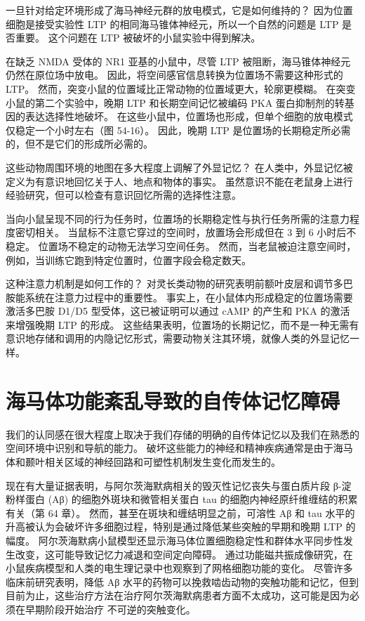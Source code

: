 一旦针对给定环境形成了海马神经元群的放电模式，它是如何维持的？ 因为位置细胞是接受实验性 LTP 的相同海马锥体神经元，所以一个自然的问题是 LTP 是否重要。 这个问题在 LTP 被破坏的小鼠实验中得到解决。

在缺乏 NMDA 受体的 NR1 亚基的小鼠中，尽管 LTP 被阻断，海马锥体神经元仍然在原位场中放电。 因此，将空间感官信息转换为位置场不需要这种形式的 LTP。 然而，突变小鼠的位置域比正常动物的位置域更大，轮廓更模糊。 在突变小鼠的第二个实验中，晚期 LTP 和长期空间记忆被编码 PKA 蛋白抑制剂的转基因的表达选择性地破坏。 在这些小鼠中，位置场也形成，但单个细胞的放电模式仅稳定一个小时左右（图 54-16）。 因此，晚期 LTP 是位置场的长期稳定所必需的，但不是它们的形成所必需的。

这些动物周围环境的地图在多大程度上调解了外显记忆？ 在人类中，外显记忆被定义为有意识地回忆关于人、地点和物体的事实。 虽然意识不能在老鼠身上进行经验研究，但可以检查有意识回忆所需的选择性注意。

当向小鼠呈现不同的行为任务时，位置场的长期稳定性与执行任务所需的注意力程度密切相关。 当鼠标不注意它穿过的空间时，放置场会形成但在 3 到 6 小时后不稳定。 位置场不稳定的动物无法学习空间任务。 然而，当老鼠被迫注意空间时，例如，当训练它跑到特定位置时，位置字段会稳定数天。

这种注意力机制是如何工作的？ 对灵长类动物的研究表明前额叶皮层和调节多巴胺能系统在注意力过程中的重要性。 事实上，在小鼠体内形成稳定的位置场需要激活多巴胺 D1/D5 型受体，这已被证明可以通过 cAMP 的产生和 PKA 的激活来增强晚期 LTP 的形成。 这些结果表明，位置场的长期记忆，而不是一种无需有意识地存储和调用的内隐记忆形式，需要动物关注其环境，就像人类的外显记忆一样。


\section{海马体功能紊乱导致的自传体记忆障碍}

我们的认同感在很大程度上取决于我们存储的明确的自传体记忆以及我们在熟悉的空间环境中识别和导航的能力。 破坏这些能力的神经和精神疾病通常是由于海马体和颞叶相关区域的神经回路和可塑性机制发生变化而发生的。

现在有大量证据表明，与阿尔茨海默病相关的毁灭性记忆丧失与蛋白质片段 β-淀粉样蛋白 (Aβ) 的细胞外斑块和微管相关蛋白 tau 的细胞内神经原纤维缠结的积累有关（第 64 章）。 然而，甚至在斑块和缠结明显之前，可溶性 Aβ 和 tau 水平的升高被认为会破坏许多细胞过程，特别是通过降低某些突触的早期和晚期 LTP 的幅度。 阿尔茨海默病小鼠模型还显示海马体位置细胞稳定性和群体水平同步性发生改变，这可能导致记忆力减退和空间定向障碍。 通过功能磁共振成像研究，在小鼠疾病模型和人类的电生理记录中也观察到了网格细胞功能的变化。 尽管许多临床前研究表明，降低 Aβ 水平的药物可以挽救啮齿动物的突触功能和记忆，但到目前为止，这些治疗方法在治疗阿尔茨海默病患者方面不太成功，这可能是因为必须在早期阶段开始治疗 不可逆的突触变化。

